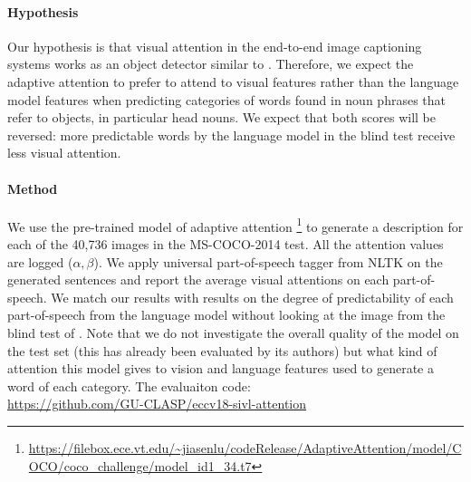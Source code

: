 \paragraph{Hypothesis}

Our hypothesis is that visual attention in the end-to-end image captioning
systems works as an object detector similar to
\cite{ba2014multiple,mnih2014recurrent}.
Therefore, we expect the adaptive attention to prefer to attend to visual
features rather than the language model features when predicting categories of
words found in noun phrases that refer to objects, in particular head nouns.
We expect that both scores will be reversed:
more predictable words by the language model in the blind test receive less
visual attention.

\paragraph{Method}

We use the pre-trained model of adaptive attention
\footnote{\url{https://filebox.ece.vt.edu/~jiasenlu/codeRelease/AdaptiveAttention/model/COCO/coco_challenge/model_id1_34.t7}}
to generate a description for each of the 40,736 images in the MS-COCO-2014
test. All the attention values are logged ($\alpha, \beta$). We apply universal
part-of-speech tagger from NLTK \cite{bird2009natural} on the generated
sentences and report the average visual attentions on each part-of-speech.
We match our results with results on the degree of predictability of each
part-of-speech from the language model without looking at the image from
the blind test of \cite{shekhar2017vision}.
Note that we do not investigate the overall quality of the model on the test
set (this has already been evaluated by its authors)
but what kind of attention this model gives to vision and language features
used to generate a word of each category.
The evaluaiton code:  \\
\url{https://github.com/GU-CLASP/eccv18-sivl-attention}

